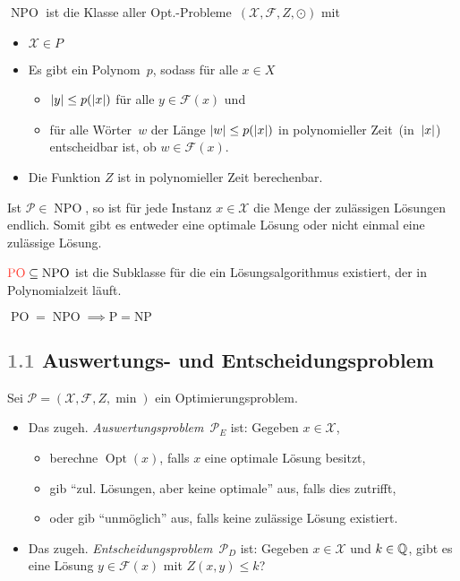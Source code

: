 \documentclass{cheat-sheet}
\newcommand{\Instances}{\mathcal{X}} %
\newcommand{\Feasible}{\mathcal{F}} %
\newcommand{\ObjFun}{Z} %
\newcommand{\Goal}{\odot} %
\newcommand{\OptTuple}{(\Instances{}, \Feasible{}, \ObjFun{}, \Goal)} %
\newcommand{\MinOptTuple}{(\Instances{}, \Feasible{}, \ObjFun{}, \min)} %
\DeclareMathOperator{\Opt}{Opt} %
\newcommand{\size}[1]{\abs{#1}} %
\DeclareMathOperator{\NPO}{NPO} %
\DeclareMathOperator{\PO}{PO} %
\newcommand{\Prob}{\mathcal{P}} %
\newcommand{\Defn}[1]{\textcolor{DefinitionColor}{#1}}
\newcommand{\scriptSection}[1]{\textcolor{gray}{#1}\enspace}
\begin{document}
\begin{defn}
  \Defn{$\NPO$} ist die Klasse aller Opt.-Probleme~$\OptTuple$ mit
  \begin{itemize}
    \item $\Instances{} \in P$
    \item Es gibt ein Polynom~$p$, sodass für alle $x \in X$
    \begin{itemize}
      \item $\size{y} \leq p(\size{x})$ für alle $y \in \Feasible(x)$ und
      \item für alle Wörter~$w$ der Länge $\size{w} \leq p(\size{x})$ in polynomieller Zeit~(in~$\size{x}$) entscheidbar ist, ob $w \in \Feasible(x)$.
    \end{itemize}
    \item Die Funktion $\ObjFun$ ist in polynomieller Zeit berechenbar.
  \end{itemize}
\end{defn}

\begin{bem}
  Ist $\Prob \in \NPO$, so ist für jede Instanz $x \in \Instances$ die Menge der zulässigen Lösungen endlich.
  Somit gibt es entweder eine optimale Lösung oder nicht einmal eine zulässige Lösung.
\end{bem}

\begin{defn}
  $\Defn{\PO} \subseteq \NPO$ ist die Subklasse für die ein Lösungsalgorithmus existiert, der in Polynomialzeit läuft.
\end{defn}

\begin{beob}
  $\PO = \NPO \implies \text{P} = \text{NP}$
\end{beob}

\subsection{\scriptSection{1.1} Auswertungs- und Entscheidungsproblem}

\begin{defn}
  Sei $\Prob = \MinOptTuple$ ein Optimierungsproblem.
  \begin{itemize}
    \item Das zugeh. \emph{Auswertungsproblem}~$\Prob_E$ ist: Gegeben $x \in \Instances$,
    \begin{itemize}
      \item berechne $\Opt(x)$, falls $x$ eine optimale Lösung besitzt,
      \item gib "`zul. Lösungen, aber keine optimale"' aus, falls dies zutrifft,
      \item oder gib "`unmöglich"' aus, falls keine zulässige Lösung existiert.
    \end{itemize}
    \item Das zugeh. \emph{Entscheidungsproblem}~$\Prob_D$ ist: Gegeben $x \in \Instances$ und $k \in \mathbb{Q}$, gibt es eine Lösung $y \in \Feasible(x)$ mit $Z(x, y) \leq k$?
  \end{itemize}
\end{defn}
\end{document}
